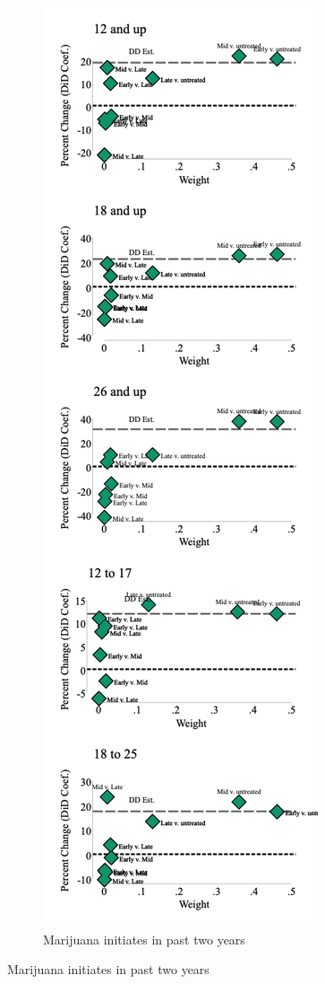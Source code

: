 \documentclass[12pt]{article}%
\begin{document}
\begin{appendices}
\begin{figure}
\begin{minipage}{.9\linewidth}
\begin{subfigure}[b]{0.32\columnwidth}
  \end{subfigure}
 \hfill %
  \begin{subfigure}[b]{0.32\columnwidth}
      \caption{\scriptsize{Marijuana initiates in past two years}}
    \includegraphics[width=\linewidth]{../output/plots/bacon_weights_ln_mj_first_use.png}

\end{subfigure}
\end{minipage}
\end{figure}
\end{appendices}
\end{document}
